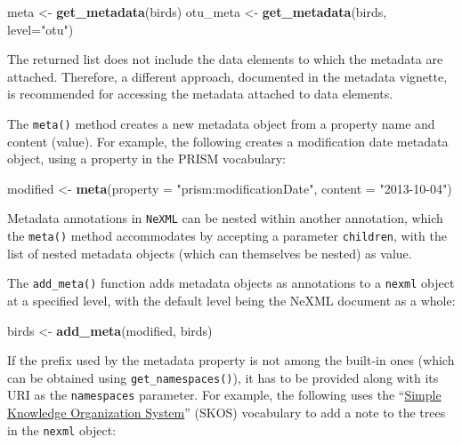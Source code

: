 \documentclass[author-year, review, 11pt]{elsarticle} %
\newenvironment{Shaded}{\begin{snugshade}}{\end{snugshade}}
\newcommand{\KeywordTok}[1]{\textcolor[rgb]{0.13,0.29,0.53}{\textbf{{#1}}}}
\newcommand{\DataTypeTok}[1]{\textcolor[rgb]{0.13,0.29,0.53}{{#1}}}
\newcommand{\StringTok}[1]{\textcolor[rgb]{0.31,0.60,0.02}{{#1}}}
\newcommand{\NormalTok}[1]{{#1}}
\begin{document}
\begin{Shaded}
\begin{Highlighting}[]
\NormalTok{meta <-}\StringTok{ }\KeywordTok{get_metadata}\NormalTok{(birds) }
\NormalTok{otu_meta <-}\StringTok{ }\KeywordTok{get_metadata}\NormalTok{(birds, }\DataTypeTok{level=}\StringTok{"otu"}\NormalTok{)}
\end{Highlighting}
\end{Shaded}

The returned list does not include the data elements to which the
metadata are attached. Therefore, a different approach, documented in
the metadata vignette, is recommended for accessing the metadata
attached to data elements.

The \texttt{meta()} method creates a new metadata object from a property
name and content (value). For example, the following creates a
modification date metadata object, using a property in the PRISM
vocabulary:

\begin{Shaded}
\begin{Highlighting}[]
\NormalTok{modified <-}\StringTok{ }\KeywordTok{meta}\NormalTok{(}\DataTypeTok{property =} \StringTok{"prism:modificationDate"}\NormalTok{, }\DataTypeTok{content =} \StringTok{"2013-10-04"}\NormalTok{)}
\end{Highlighting}
\end{Shaded}

Metadata annotations in \texttt{NeXML} can be nested within another
annotation, which the \texttt{meta()} method accommodates by accepting a
parameter \texttt{children}, with the list of nested metadata objects
(which can themselves be nested) as value.

The \texttt{add\_meta()} function adds metadata objects as annotations
to a \texttt{nexml} object at a specified level, with the default level
being the NeXML document as a whole:

\begin{Shaded}
\begin{Highlighting}[]
\NormalTok{birds <-}\StringTok{ }\KeywordTok{add_meta}\NormalTok{(modified, birds) }
\end{Highlighting}
\end{Shaded}

If the prefix used by the metadata property is not among the built-in
ones (which can be obtained using \texttt{get\_namespaces()}), it has to
be provided along with its URI as the \texttt{namespaces} parameter. For
example, the following uses the
``\href{http://www.w3.org/TR/skos-reference/}{Simple Knowledge
Organization System}'' (SKOS) vocabulary to add a note to the trees in
the \texttt{nexml} object:
\end{document}
